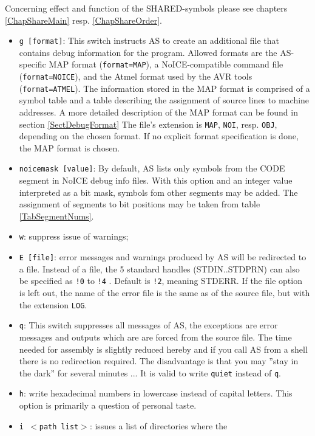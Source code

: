 \documentclass[12pt,twoside]{report}
\newcommand{\tty}[1]{{\tt #1}}
\begin{document}
Concerning effect and function of the SHARED-symbols please see
chapters \ref{ChapShareMain} resp. \ref{ChapShareOrder}.
\begin{itemize}
\item{\tty{g [format]}: This switch instructs AS to create an additional
      file that contains debug information for the program.  Allowed
      formats are the AS-specific MAP format ({\tt format=MAP}), a
      NoICE-compatible command file ({\tt format=NOICE}), and the Atmel
      format used by the AVR tools ({\tt format=ATMEL}). The information
      stored in the MAP format is comprised of a symbol table and a table
      describing the assignment of source lines to machine addresses.  A
      more detailed description of the MAP format can be found in section
      \ref{SectDebugFormat}  The file's extension is \tty{MAP}, \tty{NOI},
      resp. \tty{OBJ}, depending on the chosen format.  If no explicit
      format specification is done, the MAP format is chosen.}
\item{\tty{noicemask [value]}: By default, AS lists only symbols from the
      CODE segment in NoICE debug info files.  With this option and an
      integer value interpreted as a bit mask, symbols fom other segments
      may be added.  The assignment of segments to bit positions may
      be taken from table \ref{TabSegmentNums}.}
\item{\tty{w}: suppress issue of warnings;}
\item{\tty{E [file]}: error messages and warnings produced by AS will be
      redirected to a file. Instead of a file, the 5 standard
      handles (STDIN..STDPRN) can also be specified as
      \tty{!0} to \tty{!4} . Default is \tty{!2}, meaning STDERR.  If the
      file option is left out, the name of the error file
      is the same as of the source file, but with the
      extension \tty{LOG}.}
\item{\tty{q}: This switch suppresses all messages of AS, the exceptions are
      error messages and outputs which are are forced from the
      source file.  The time needed for assembly is slightly reduced
      hereby and if you call AS from a shell there is no redirection
      required.  The disadvantage is that you may ''stay in the dark''
      for several minutes ... It is valid to write \tty{quiet} instead
      of \tty{q}.}
\item{\tty{h}: write hexadecimal numbers in lowercase instead of capital
      letters. This option is primarily a question of personal
      taste.}
\item{\tty{i $<$path list$>$}: issues a list of directories where the
}
\end{itemize}
\end{document}
